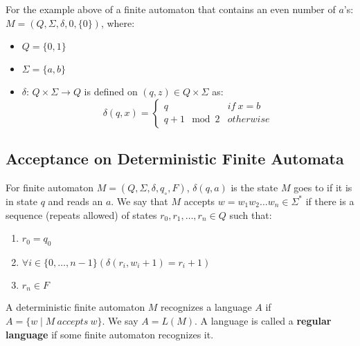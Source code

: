 \documentclass{math}
\begin{document}
For the example above of a finite automaton that contains an even number of
\( a \)'s: \( M = (Q,\Sigma,\delta,0,\{0\}) \), where:
\begin{itemize}
  \item \( Q = \{0,1\} \)
  \item \( \Sigma = \{a,b\} \)
  \item \( \delta \): \( Q\times\Sigma\to Q \) is defined on \( (q,z)\in
    Q\times\Sigma \) as:
    \[ \delta(q,x) = \begin{cases}
      q & if\ x = b \\
      q+1\mod2 & otherwise
    \end{cases} \]
\end{itemize}

\subsection*{Acceptance on Deterministic Finite Automata}
For finite automaton \( M = (Q,\Sigma,\delta,q_{\circ},F) \), \( \delta(q,a) \)
is the state \( M \) goes to if it is in state \( q \) and reads an \( a \).
We say that \( M \) accepts \( w = w_1w_2\dots w_n\in\Sigma^{*} \) if there is
a sequence (repeats allowed) of states \( r_0,r_1,\dots,r_n\in Q \) such that:
\begin{enumerate}
  \item \( r_0 = q_0 \)
  \item \( \forall{i}\in\{0,\dots,n-1\}(\delta(r_i,w_i+1) = r_i+1) \)
  \item \( r_n \in F \)
\end{enumerate}
A deterministic finite automaton \( M \) recognizes a language \( A \) if
\( A = \{w\mid M\ accepts\ w\} \). We say \( A = L(M) \). A language is called
a \textbf{regular language} if some finite automaton recognizes it.
\end{document}
